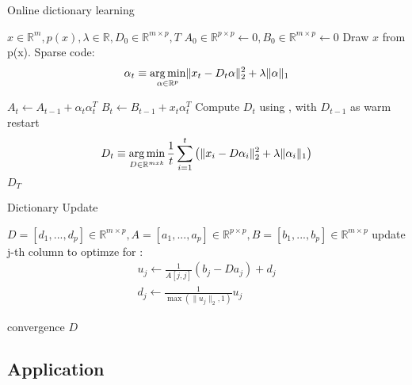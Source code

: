 \begin{algorithm}
\caption{Online dictionary learning \cite{Mairal2010}}
\begin{algorithmic}[1]
\REQUIRE $x \in \mathbb{R}^m,  p \left( x \right), \lambda \in \mathbb{R}, D_0 \in \mathbb{R}^{m \times p}, T$
\STATE $A_0 \in \mathbb{R}^{p \times p} \gets  0, B_0 \in \mathbb{R}^{m \times p}\gets 0$
\STATE Draw $x$ from p(x).
\STATE Sparse code:
\begin{align} 
\alpha_t \equiv \operatorname*{arg\,min}_{\alpha\in\mathbb{R}^{p}}  \lVert x_t - D_t\alpha \rVert^{2}_{2}  +  \lambda \lVert \alpha \rVert_{1}
\end{align}

\STATE $A_t \gets A_{t-1} + \alpha_t\alpha_t^T$
\STATE $B_t \gets B_{t-1} + x_t\alpha_t^T$
\STATE Compute $D_t$ using , with $D_{t-1}$ as warm restart 
\begin{align} 
D_t \equiv \operatorname*{arg\,min}_{D \in \mathbb{R}^{m x k}}  \frac{1}{t} \sum_{i=1}^t \left( \lVert x_i - D\alpha_i \rVert^{2}_{2}  +  \lambda \lVert \alpha_i \rVert_{1} \right) \label{eq:update}
\end{align}
\ENDFOR
\RETURN $D_T$
\end{algorithmic}
\end{algorithm}


\begin{algorithm}
\caption{Dictionary Update}
\label{alg:update}
\begin{algorithmic}[1]
\REQUIRE $D=[d_1,...,d_p] \in \mathbb{R}^{m \times p}, A=[a_1,...,a_p] \in \mathbb{R}^{p \times p}, B=[b_1,...,b_p] \in \mathbb{R}^{m \times p}$
\REPEAT
{}
\STATE update j-th column to optimze for :
\begin{align}
u_j \gets \frac{1}{A[j,j]}\left(b_j-Da_j\right)+d_j \\
d_j \gets \frac{1}{\max\left(\lVert u_j \rVert_2,1\right)} u_j
\end{align}

\ENDFOR
\UNTIL convergence 
\RETURN $D$
\end{algorithmic}
\end{algorithm}

\subsection{Application}

